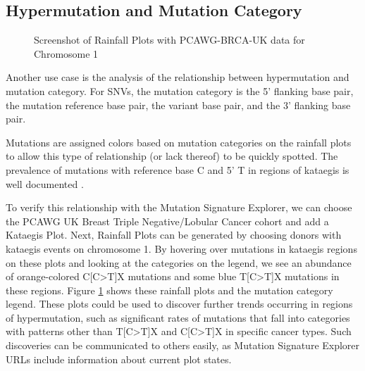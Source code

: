 \documentclass[12pt, letterpaper]{article}
\begin{document}
\subsection{Hypermutation and Mutation Category}
\begin{figure}
    \centering
    \caption{Screenshot of Rainfall Plots with PCAWG-BRCA-UK data for Chromosome 1}
    \label{fig:caseStudy2}
\end{figure}
Another use case is the analysis of the relationship between hypermutation and mutation category.
For SNVs, the mutation category is the 5' flanking base pair, the mutation reference base pair, the variant base pair, and the 3' flanking base pair.

Mutations are assigned colors based on mutation categories on the rainfall plots to allow this type of relationship (or lack thereof) to be quickly spotted.
The prevalence of mutations with reference base C and 5' T in regions of kataegis is well documented \cite{taylor2013dna}.

To verify this relationship with the Mutation Signature Explorer, we can choose the PCAWG UK Breast Triple Negative/Lobular Cancer cohort and add a Kataegis Plot.
Next, Rainfall Plots can be generated by choosing donors with kataegis events on chromosome 1.
By hovering over mutations in kataegis regions on these plots and looking at the categories on the legend, we see an abundance of orange-colored C[C\textgreater T]X mutations and some blue T[C\textgreater T]X mutations in these regions.
Figure \ref{fig:caseStudy2} shows these rainfall plots and the mutation category legend.
These plots could be used to discover further trends occurring in regions of hypermutation, such as significant rates of mutations that fall into categories with patterns other than T[C\textgreater T]X and C[C\textgreater T]X in specific cancer types.
Such discoveries can be communicated to others easily, as Mutation Signature Explorer URLs include information about current plot states.
\end{document}
